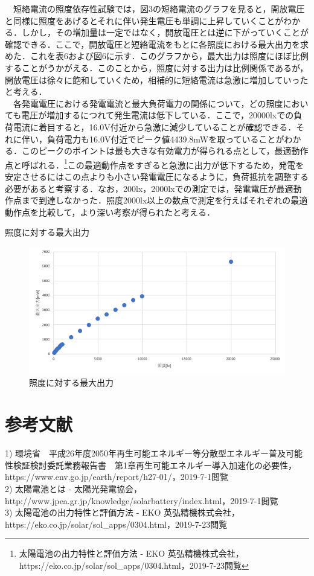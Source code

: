 　短絡電流の照度依存性試験では，図3の短絡電流のグラフを見ると，開放電圧と同様に照度をあげるとそれに伴い発生電圧も単調に上昇していくことがわかる．しかし，その増加量は一定ではなく，開放電圧とは逆に下がっていくことが確認できる．ここで，開放電圧と短絡電流をもとに各照度における最大出力を求めた．これを表6および図6に示す．このグラフから，最大出力は照度にほぼ比例することがうかがえる．このことから，照度に対する出力は比例関係であるが，開放電圧は徐々に飽和していくため，相補的に短絡電流は急激に増加していったと考える．\\

　各発電電圧における発電電流と最大負荷電力の関係について，どの照度においても電圧が増加するにつれて発生電流は低下している．ここで，20000lxでの負荷電流に着目すると，16.0V付近から急激に減少していることが確認できる．それに伴い，負荷電力も16.0V付近でピーク値4439.8mWを取っていることがわかる．このピークのポイントは最も大きな有効電力が得られる点として，最適動作点と呼ばれる．\footnote{太陽電池の出力特性と評価方法 - EKO 英弘精機株式会社，https://eko.co.jp/solar/sol\_apps/0304.html，2019-7-23閲覧}この最適動作点をすぎると急激に出力が低下するため，発電を安定させるにはこの点よりも小さい発電電圧になるように，負荷抵抗を調整する必要があると考察する．なお，200lx，2000lxでの測定では，発電電圧が最適動作点まで到達しなかった．照度2000lx以上の数点で測定を行えばそれぞれの最適動作点を比較して，より深い考察が得られたと考える．

\newpage
\begin{table}[htbp]
  \centering
  \caption{照度に対する最大出力}
  
\end{table}

\begin{figure}[H]
  \centering
  \includegraphics[width=15cm]{./fig/fig06.png}
  \caption{照度に対する最大出力}
\end{figure}

\newpage
\section{参考文献}
1) 環境省　平成26年度2050年再生可能エネルギー等分散型エネルギー普及可能性検証検討委託業務報告書　第1章再生可能エネルギー導入加速化の必要性，https://www.env.go.jp/earth/report/h27-01/，2019-7-1閲覧\\

2) 太陽電池とは - 太陽光発電協会，http://www.jpea.gr.jp/knowledge/solarbattery/index.html，2019-7-1閲覧\\

3) 太陽電池の出力特性と評価方法 - EKO 英弘精機株式会社，https://eko.co.jp/solar/sol\_apps/0304.html，2019-7-23閲覧

